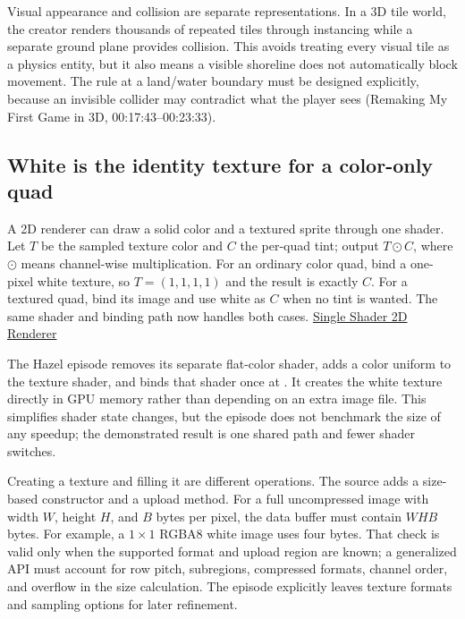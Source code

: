 Visual appearance and collision are separate representations. In a 3D tile world, the creator renders thousands of repeated tiles through instancing while a separate ground plane provides collision. This avoids treating every visual tile as a physics entity, but it also means a visible shoreline does not automatically block movement. The rule at a land/water boundary must be designed explicitly, because an invisible collider may contradict what the player sees (Remaking My First Game in 3D, 00:17:43--00:23:33).

\subsection{White is the identity texture for a color-only quad}\label{06-engine-ii-ch031-white-is-the-identity-texture-for-a-color-only-quad}

\hypertarget{06-engine-ii-ch031-white-is-the-identity-texture-for-a-color-only-quad}{}

A 2D renderer can draw a solid color and a textured sprite through one shader. Let \(T\) be the sampled texture color and \(C\) the per-quad tint; output \(T\odot C\), where \(\odot\) means channel-wise multiplication. For an ordinary color quad, bind a one-pixel white texture, so \(T=(1,1,1,1)\) and the result is exactly \(C\). For a textured quad, bind its image and use white as \(C\) when no tint is wanted. The same shader and binding path now handles both cases. \href{https://www.youtube.com/watch?v=-myXuS3t1W4}{Single Shader 2D Renderer}

The Hazel episode removes its separate flat-color shader, adds a color uniform to the texture shader, and binds that shader once at . It creates the white texture directly in GPU memory rather than depending on an extra image file. This simplifies shader state changes, but the episode does not benchmark the size of any speedup; the demonstrated result is one shared path and fewer shader switches.

Creating a texture and filling it are different operations. The source adds a size-based constructor and a  upload method. For a full uncompressed image with width \(W\), height \(H\), and \(B\) bytes per pixel, the data buffer must contain \(W H B\) bytes. For example, a \(1\times1\) RGBA8 white image uses four bytes. That check is valid only when the supported format and upload region are known; a generalized API must account for row pitch, subregions, compressed formats, channel order, and overflow in the size calculation. The episode explicitly leaves texture formats and sampling options for later refinement.

